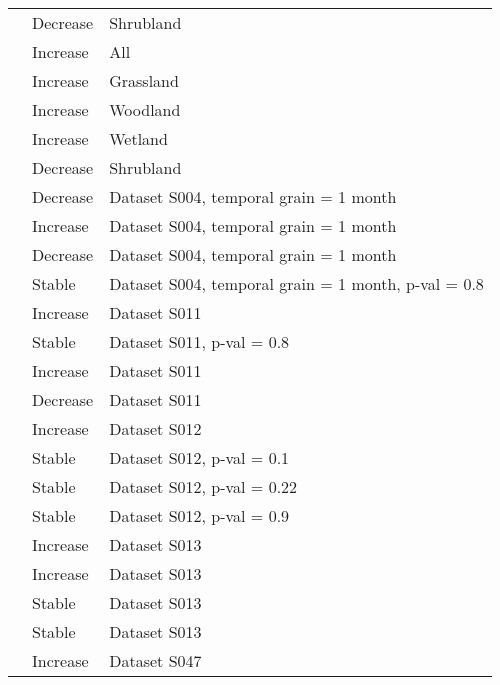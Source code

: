 \documentclass[
  12pt,
  oneside]{report}
\begin{document}
\begin{landscape}
\begin{longtable}[t]{ll>{\raggedright\arraybackslash}p{40em}}
\cite{schipper_contrasting_2016} & Decrease & \vphantom{1} Shrubland\\
\cite{schipper_contrasting_2016} & Increase & All\\
\cite{schipper_contrasting_2016} & Increase & Grassland\\
\cite{schipper_contrasting_2016} & Increase & Woodland\\
\addlinespace
\cite{schipper_contrasting_2016} & Increase & Wetland\\
\cite{schipper_contrasting_2016} & Decrease & Shrubland\\
\cite{pilotto_meta-analysis_2020} & Decrease & Dataset S004, temporal grain = 1 \vphantom{1} month\\
\cite{pilotto_meta-analysis_2020} & Increase & Dataset S004, temporal grain = 1 month\\
\cite{pilotto_meta-analysis_2020} & Decrease & Dataset S004, temporal grain = 1 month\\
\addlinespace
\cite{pilotto_meta-analysis_2020} & Stable & Dataset S004, temporal grain = 1 month, p-val = 0.8\\
\cite{pilotto_meta-analysis_2020} & Increase & Dataset \vphantom{1} S011\\
\cite{pilotto_meta-analysis_2020} & Stable & Dataset S011, p-val = 0.8\\
\cite{pilotto_meta-analysis_2020} & Increase & Dataset S011\\
\cite{pilotto_meta-analysis_2020} & Decrease & Dataset S011\\
\addlinespace
\cite{pilotto_meta-analysis_2020} & Increase & Dataset S012\\
\cite{pilotto_meta-analysis_2020} & Stable & Dataset S012, p-val = 0.1\\
\cite{pilotto_meta-analysis_2020} & Stable & Dataset S012, p-val = 0.22\\
\cite{pilotto_meta-analysis_2020} & Stable & Dataset S012, p-val = 0.9\\
\cite{pilotto_meta-analysis_2020} & Increase & Dataset \vphantom{1} S013\\
\addlinespace
\cite{pilotto_meta-analysis_2020} & Increase & Dataset S013\\
\cite{pilotto_meta-analysis_2020} & Stable & Dataset \vphantom{1} S013\\
\cite{pilotto_meta-analysis_2020} & Stable & Dataset S013\\
\cite{pilotto_meta-analysis_2020} & Increase & Dataset \vphantom{2} S047\\

\end{longtable}
\end{landscape}
\end{document}
